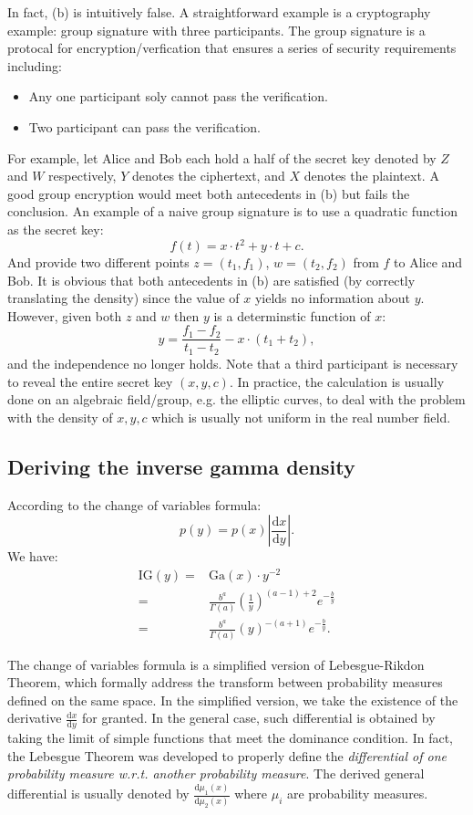 \documentclass[UTF8]{ctexart}
\begin{document}
In fact, (b) is intuitively false.
A straightforward example is a cryptography example: group signature with three participants.
The group signature is a protocal for encryption/verfication that ensures a series of security requirements including:
\begin{itemize}
\item Any one participant soly cannot pass the verification.
\item Two participant can pass the verification.
\end{itemize}
For example, let Alice and Bob each hold a half of the secret key denoted by $Z$ and $W$ respectively, $Y$ denotes the ciphertext, and $X$ denotes the plaintext.
A good group encryption would meet both antecedents in (b) but fails the conclusion.
An example of a naive group signature is to use a quadratic function as the secret key:
$$f(t)=x\cdot t^{2}+y\cdot t +c.$$
And provide two different points $z=(t_{1},f_{1})$, $w=(t_{2},f_{2})$ from $f$ to Alice and Bob.
It is obvious that both antecedents in (b) are satisfied (by correctly translating the density) since the value of $x$ yields no information about $y$.
However, given both $z$ and $w$ then $y$ is a determinstic function of $x$:
$$y=\frac{f_{1}-f_{2}}{t_{1}-t_{2}}-x\cdot(t_{1}+t_{2}),$$
and the independence no longer holds.
Note that a third participant is necessary to reveal the entire secret key $(x,y,c)$.
In practice, the calculation is usually done on an algebraic field/group, e.g. the elliptic curves, to deal with the problem with the density of $x,y,c$ which is usually not uniform in the real number field.

\subsection{Deriving the inverse gamma density}
According to the change of variables formula:
$$p(y)=p(x)|\frac{\text{d}x}{\text{d}y}|.$$
We have:
\begin{align}
\text{IG}(y)=&\text{Ga}(x)\cdot y^{-2} \nonumber \\
=&\frac{b^{a}}{\Gamma(a)}(\frac{1}{y})^{(a-1)+2}e^{-\frac{b}{y}} \nonumber \\
=&\frac{b^{a}}{\Gamma(a)}(y)^{-(a+1)}e^{-\frac{b}{y}}. \nonumber
\end{align}

The change of variables formula is a simplified version of Lebesgue-Rikdon Theorem, which formally address the transform between probability measures defined on the same space.
In the simplified version, we take the existence of the derivative $\frac{\text{d}x}{\text{d}y}$ for granted.
In the general case, such differential is obtained by taking the limit of simple functions that meet the dominance condition.
In fact, the Lebesgue Theorem was developed to properly define the \emph{differential of one probability measure w.r.t. another probability measure}.
The derived general differential is usually denoted by $\frac{\text{d}\mu_{1}(x)}{\text{d}\mu_{2}(x)}$ where $\mu_{i}$ are probability measures.
\end{document}
